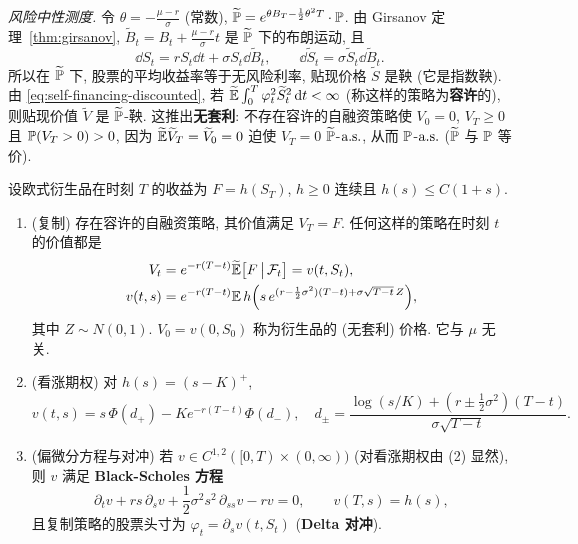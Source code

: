 \emph{风险中性测度.} 令 $\theta=-\frac{\mu-r}{\sigma}$ (常数), $\widetilde{\P}=e^{\theta B_T-\frac{1}{2}\theta^2T}\cdot\P$. 由 Girsanov 定理~\ref{thm:girsanov}, $\widetilde{B}_t=B_t+\frac{\mu-r}{\sigma}t$ 是 $\widetilde{\P}$ 下的布朗运动, 且
\[
\dd S_t=rS_t\dd t+\sigma S_t\dd\widetilde{B}_t,\qquad\dd\widetilde{S}_t=\sigma\widetilde{S}_t\dd\widetilde{B}_t.
\]
所以在 $\widetilde{\P}$ 下, 股票的平均收益率等于无风险利率, 贴现价格 $\widetilde{S}$ 是鞅 (它是指数鞅). 由 \eqref{eq:self-financing-discounted}, 若 $\widetilde{\E}\int_0^T\varphi_t^2\widetilde{S}_t^2\dd t<\infty$ (称这样的策略为\textbf{容许}的), 则贴现价值 $\widetilde{V}$ 是 $\widetilde{\P}$-鞅. 这推出\textbf{无套利}: 不存在容许的自融资策略使 $V_0=0$, $V_T\ge0$ 且 $\P(V_T>0)>0$, 因为 $\widetilde{\E}\widetilde{V}_T=\widetilde{V}_0=0$ 迫使 $V_T=0$ $\widetilde{\P}$-$\as$, 从而 $\P$-$\as$ ($\widetilde{\P}$ 与 $\P$ 等价).

\begin{theorem}\label{thm:black-scholes}
设欧式衍生品在时刻 $T$ 的收益为 $F=h(S_T)$, $h\ge0$ 连续且 $h(s)\le C(1+s)$.
\begin{enumerate}
\item (复制) 存在容许的自融资策略, 其价值满足 $V_T=F$. 任何这样的策略在时刻 $t$ 的价值都是
\begin{align*}
V_t&=e^{-r(T-t)}\widetilde{\E}\big[F\,\big|\,\mathcal{F}_t\big]=v(t,S_t),\\
v(t,s)&=e^{-r(T-t)}\E\,h\Big(s\,e^{(r-\frac{1}{2}\sigma^2)(T-t)+\sigma\sqrt{T-t}\,Z}\Big),
\end{align*}
其中 $Z\sim N(0,1)$. $V_0=v(0,S_0)$ 称为衍生品的 (无套利) 价格. 它与 $\mu$ 无关.
\item (看涨期权) 对 $h(s)=(s-K)^+$,
\[
v(t,s)=s\,\Phi(d_+)-Ke^{-r(T-t)}\Phi(d_-),\quad d_\pm=\frac{\log(s/K)+(r\pm\frac{1}{2}\sigma^2)(T-t)}{\sigma\sqrt{T-t}}.
\]
\item (偏微分方程与对冲) 若 $v\in C^{1,2}([0,T)\times(0,\infty))$ (对看涨期权由 (2) 显然), 则 $v$ 满足 \textbf{Black-Scholes 方程}
\[
\partial_tv+rs\,\partial_sv+\frac{1}{2}\sigma^2s^2\,\partial_{ss}v-rv=0,\qquad v(T,s)=h(s),
\]
且复制策略的股票头寸为 $\varphi_t=\partial_sv(t,S_t)$ (\textbf{Delta 对冲}).
\end{enumerate}
\end{theorem}

